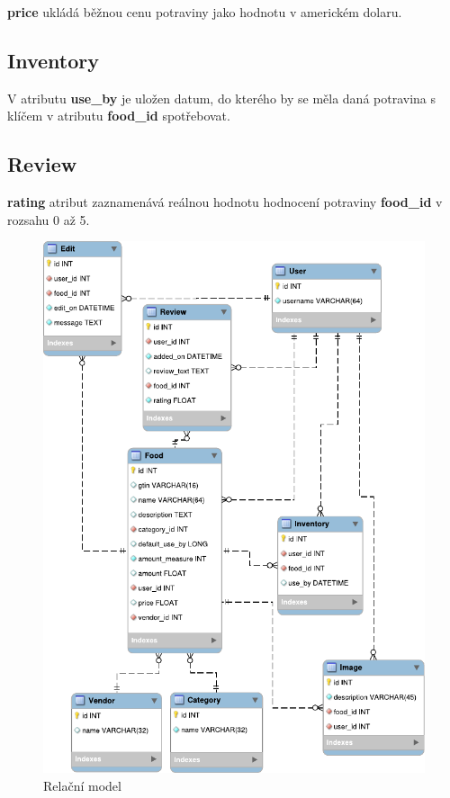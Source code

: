 \documentclass[thesis=B,czech]{FITthesis}[2013/10/20]
\begin{document}
\textbf{price} ukládá běžnou cenu potraviny jako hodnotu v americkém dolaru.

\subsection{Inventory}
V atributu \textbf{use\_by} je uložen datum, do kterého by se měla daná potravina s klíčem v atributu \textbf{food\_id} spotřebovat.

\subsection{Review}
\textbf{rating} atribut zaznamenává reálnou hodnotu hodnocení potraviny \textbf{food\_id} v rozsahu 0 až 5.


\begin{figure}[H]
  \centering
  \includegraphics[scale=1.05]{diagrams/relational_model.pdf}
  \caption{Relační model}
  \label{fig:RelationalModel}
\end{figure}
\end{document}
